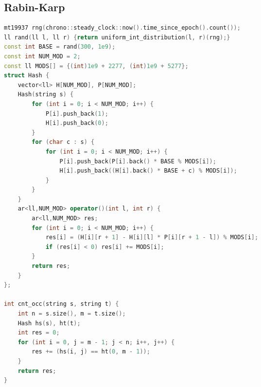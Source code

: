 \documentclass{article}
\begin{document}
\begin{multicols}{2}
\begin{lstlisting}[linewidth=\columnwidth,breaklines=true,language=C++]
\end{lstlisting}
\subsection{Rabin-Karp}
\lstset {    language=C++,
    basicstyle=\small\ttfamily,
    numbers=left,
    breaklines=true,
    tabsize=4}
\begin{lstlisting}[linewidth=\columnwidth,breaklines=true,language=C++]
mt19937 rng(chrono::steady_clock::now().time_since_epoch().count());
ll rand(ll l, ll r) {return uniform_int_distribution(l, r)(rng);}
const int BASE = rand(300, 1e9);
const int NUM_MOD = 2;
const ll MODS[] = {(int)1e9 + 2277, (int)1e9 + 5277};
struct Hash {
    vector<ll> H[NUM_MOD], P[NUM_MOD];
    Hash(string s) {
        for (int i = 0; i < NUM_MOD; i++) {
            P[i].push_back(1);
            H[i].push_back(0);
        }
        for (char c : s) {
            for (int i = 0; i < NUM_MOD; i++) {
                P[i].push_back(P[i].back() * BASE % MODS[i]);
                H[i].push_back((H[i].back() * BASE + c) % MODS[i]);
            }
        }
    } 
    ar<ll,NUM_MOD> operator()(int l, int r) {
        ar<ll,NUM_MOD> res;
        for (int i = 0; i < NUM_MOD; i++) {
            res[i] = (H[i][r + 1] - H[i][l] * P[i][r + 1 - l]) % MODS[i];
            if (res[i] < 0) res[i] += MODS[i];
        }
        return res;
    }
};

int cnt_occ(string s, string t) {
    int n = s.size(), m = t.size();
    Hash hs(s), ht(t);
    int res = 0;
    for (int i = 0, j = m - 1; j < n; i++, j++) {
        res += (hs(i, j) == ht(0, m - 1));
    }
    return res;
}
 
\end{lstlisting}
\end{multicols}
\end{document}
